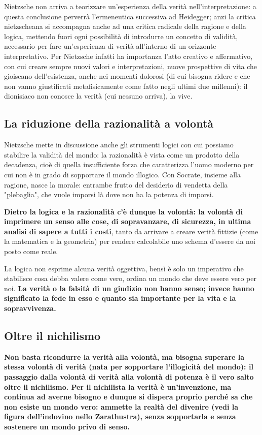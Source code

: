 Nietzsche non arriva a teorizzare un'esperienza della verità nell'interpretazione: a questa conclusione perverrà l'ermeneutica successiva ad Heidegger; anzi la critica nietzscheana si accompagna anche ad una critica radicale della ragione e della logica, mettendo fuori ogni possibilità di introdurre un concetto di validità, necessario per fare un'esperienza di verità all'interno di un orizzonte interpretativo. Per Nietzsche infatti ha importanza l'atto creativo e affermativo, con cui creare sempre nuovi valori e interpretazioni, nuove prospettive di vita che gioiscano  dell'esistenza, anche nei momenti dolorosi (di cui bisogna ridere e che non vanno giustificati metafisicamente come fatto negli ultimi due millenni): il dionisiaco non conosce la verità (cui nessuno arriva), la vive.

\subsection{La riduzione della razionalità a volontà}

Nietzsche mette in discussione anche gli strumenti logici con cui possiamo stabilire la validità del mondo: la razionalità è vista come un prodotto della decadenza, cioè di quella insufficiente forza che caratterizza l'uomo moderno per cui non è in grado di sopportare il mondo illogico.
Con Socrate, insieme alla ragione, nasce la morale: entrambe frutto del desiderio di vendetta della "plebaglia", che vuole imporsi là dove non ha la potenza di imporsi.

\textbf{Dietro la logica e la razionalità c'è dunque la volontà: la volontà di imprimere un senso alle cose, di sopravanzare, di sicurezza, in ultima analisi di sapere a tutti i costi}, tanto da arrivare a creare verità fittizie (come la matematica e la geometria) per rendere calcolabile uno schema d'essere da noi posto come reale.

La logica non esprime alcuna verità oggettiva, bensì è solo un imperativo che stabilisce cosa debba valere come vero, ordina un mondo che deve essere vero per noi. \textbf{La verità o la falsità di un giudizio non hanno senso; invece hanno significato la fede in esso e quanto sia importante per la vita e la sopravvivenza.}

\subsection{Oltre il nichilismo}

\textbf{Non basta ricondurre la verità alla volontà, ma bisogna superare la stessa volontà di verità (nata per sopportare l'illogicità del mondo): il passaggio dalla volontà di verità alla volontà di potenza è il vero salto oltre il nichilismo. Per il nichilista la verità è un'invenzione, ma continua ad averne bisogno e dunque si dispera proprio perché sa che non esiste un mondo vero: ammette la realtà del divenire (vedi la figura dell'indovino nello Zarathustra), senza sopportarla e senza sostenere un mondo privo di senso.}

